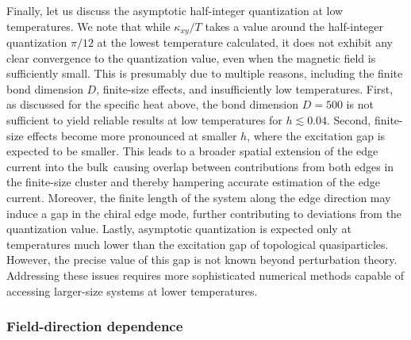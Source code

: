 \documentclass[twocolumn,superscriptaddress,showpacs, longbibliography, aps, prx]{revtex4-2}
\begin{document}
Finally, let us discuss the asymptotic half-integer quantization at low temperatures. 
We note that while $\kappa_{xy}/T$ takes a value around the half-integer quantization $\pi/12$ at the lowest temperature calculated, it does not exhibit any clear convergence to the quantization value, even when the magnetic field is sufficiently small.
This is presumably due to multiple reasons, including the finite bond dimension $D$, finite-size effects, and insufficiently low temperatures.
First, as discussed for the specific heat above, the bond dimension $D=500$ is not sufficient to yield reliable results at low temperatures for $h\lesssim0.04$.
Second, finite-size effects become more pronounced at smaller $h$, where the excitation gap is expected to be smaller. 
This leads to a broader spatial extension of the edge current into the bulk\, causing overlap between contributions from both edges in the finite-size cluster and thereby hampering accurate estimation of the edge current. 
Moreover, the finite length of the system along the edge direction may induce a gap in the chiral edge mode, further contributing to deviations from the quantization value. 
Lastly, asymptotic quantization is expected only at temperatures much lower than the excitation gap of topological quasiparticles. 
However, the precise value of this gap is not known beyond perturbation theory. 
Addressing these issues requires more sophisticated numerical methods capable of accessing larger-size systems at lower temperatures. 

\subsubsection{Field-direction dependence}
\label{subsec:field_direction_dep}
\end{document}
